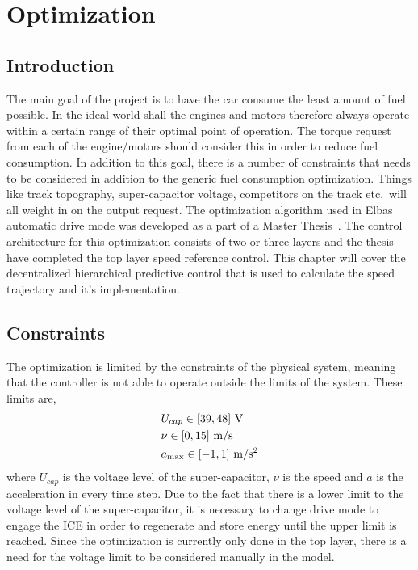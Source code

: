 \chapter{Optimization}

\section{Introduction}
The main goal of the project is to have the car consume the least amount of fuel
possible.  In the ideal world shall the engines and motors therefore always
operate within a certain range of their optimal point of operation. The torque
request from each of the engine/motors should consider this in order to reduce
fuel consumption. In addition to this goal, there is a number of constraints
that needs to be considered in addition to the generic fuel consumption
optimization.  Things like track topography, super-capacitor voltage,
competitors on the track etc.\ will all weight in on the output request. The
optimization algorithm used in Elbas automatic drive mode was developed as a
part of a Master Thesis~\cite{liu2016}. The control architecture for this
optimization consists of two or three layers and the thesis have completed the
top layer speed reference control. This chapter will cover the decentralized
hierarchical predictive control that is used to calculate the speed trajectory
and it's implementation.

\section{Constraints}
The optimization is limited by the constraints of the physical system, meaning that
the controller is not able to operate outside the limits of the system. These limits
are,
\begin{align}
    &U_{cap} \in [39,48]~\textup{V} \\
    &\nu \in [0,15]~\textup{m/s}\\
    &a_{\max} \in [-1,1]~\textup{m/s$^2$}
\end{align}
where $U_{cap}$ is the voltage level of the super-capacitor, $\nu$ is the speed
and $a$ is the acceleration in every time step. Due to the fact that there is a
lower limit to the voltage level of the super-capacitor, it is necessary to
change drive mode to engage the ICE in order to regenerate and store energy
until the upper limit is reached. Since the optimization is currently only done
in the top layer, there is a need for the voltage limit to be considered
manually in the model.

